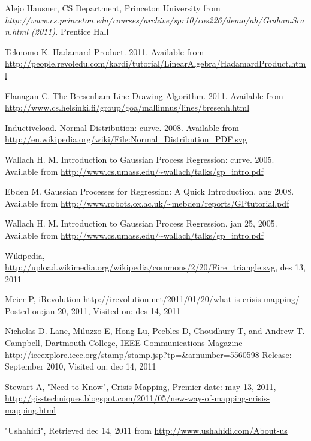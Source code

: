 
\begin{thebibliography}{4}
 Alejo Hausner, CS Department, Princeton University from
 \emph{http://www.cs.princeton.edu/courses/archive/spr10/cos226/demo/ah/GrahamScan.html (2011).} Prentice Hall
 
 Teknomo K. Hadamard Product. 2011. Available from \url{http://people.revoledu.com/kardi/tutorial/LinearAlgebra/HadamardProduct.html} 

 Flanagan C. The Bresenham Line-Drawing Algorithm. 2011. Available from \url{http://www.cs.helsinki.fi/group/goa/mallinnus/lines/bresenh.html} 

 Inductiveload. Normal Distribution: curve. 2008. Available from \url{http://en.wikipedia.org/wiki/File:Normal_Distribution_PDF.svg} 

 Wallach H. M. Introduction to Gaussian Process Regression: curve. 2005. Available from \url{http://www.cs.umass.edu/~wallach/talks/gp_intro.pdf} 

 Ebden M. Gaussian Processes for Regression: A Quick Introduction. aug 2008. Available from \url{http://www.robots.ox.ac.uk/~mebden/reports/GPtutorial.pdf} 

 Wallach H. M. Introduction to Gaussian Process Regression. jan 25, 2005. Available from \url{http://www.cs.umass.edu/~wallach/talks/gp_intro.pdf} 

 Wikipedia,       \url{http://upload.wikimedia.org/wikipedia/commons/2/20/Fire_triangle.svg}, des 13, 2011

 Meier P, \underline{iRevolution} \url{http://irevolution.net/2011/01/20/what-is-crisis-mapping/} Posted on:jan 20, 2011, Visited on: des 14, 2011

 Nicholas D. Lane, Miluzzo E, Hong Lu, Peebles D, Choudhury T,
and Andrew T. Campbell, Dartmouth College, \underline{IEEE Communications Magazine} \url{http://ieeexplore.ieee.org/stamp/stamp.jsp?tp=&arnumber=5560598 } Release: September 2010, Visited on: dec 14, 2011

 Stewart A, "Need to Know", \underline{Crisis Mapping}, Premier date: may 13, 2011, \url{http://gis-techniques.blogspot.com/2011/05/new-way-of-mapping-crisis-mapping.html}

 "Ushahidi", Retrieved dec 14, 2011 from \url{http://www.ushahidi.com/About-us}


\end{thebibliography}
